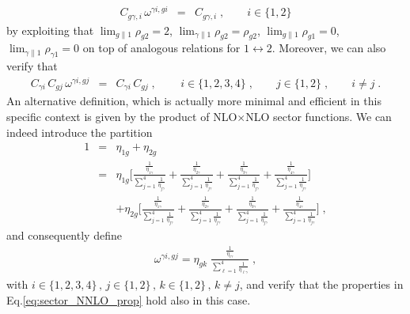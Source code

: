 \documentclass[12pt,a4paper]{article}
\newcommand{\nn}{\nonumber}
\newcommand{\beq}{\begin{eqnarray}}
\newcommand{\eeq}{\end{eqnarray}}
\begin{document}
\beq
C_{g\gamma,i} \, \omega^{\gamma i,gi} & = & C_{g\gamma,i} \; , \qquad i \in \{1,2\} 
\eeq
by exploiting that $\lim_{g \parallel 1} \rho_{g2} = 2$, 
$\lim_{\gamma \parallel 1} \rho_{g2}= \rho_{g2}$, 
$\lim_{g \parallel 1} \rho_{g1} = 0$, 
$\lim_{\gamma \parallel 1} \rho_{\gamma1} = 0$ on top of analogous relations for $1 \leftrightarrow 2$. Moreover, we can also verify that
\beq
C_{\gamma i} \, C_{g j} \, \omega^{\gamma i,g j} &=& C_{\gamma i} \, C_{gj} \; , \qquad  \, 
i\in \{1,2, 3, 4\} \; ,
\qquad 
 j\in \{1,2\}  \; , \qquad i\neq j \; .
 \label{eq:sector_NNLO_prop}
\eeq
An alternative definition, which is actually more minimal and efficient in this specific context is given by the product of NLO$\times$NLO sector functions. We can indeed introduce the partition
\beq
1 &=& \eta_{1g} + \eta_{2g}
\nn \\
&=&
\eta_{1g} \bigg[
\frac{ \frac{1}{\eta_{1\gamma}}}{\sum_{j=1}^4\frac{1}{\eta_{j\gamma}}}
+\frac{\frac{1}{\eta_{2\gamma}}}{\sum_{j=1}^4\frac{1}{\eta_{j\gamma}}}
+ \frac{\frac{1}{\eta_{3\gamma}}}{\sum_{j=1}^4\frac{1}{\eta_{j\gamma}}}
+\frac{\frac{1}{\eta_{4\gamma}}}{\sum_{j=1}^4\frac{1}{\eta_{j\gamma}}}
\bigg]
\nn \\
&& + \eta_{2g} \bigg[
\frac{ \frac{1}{\eta_{1\gamma}}}{\sum_{j=1}^4\frac{1}{\eta_{j\gamma}}}
+\frac{\frac{1}{\eta_{2\gamma}}}{\sum_{j=1}^4\frac{1}{\eta_{j\gamma}}}
+ \frac{\frac{1}{\eta_{3\gamma}}}{\sum_{j=1}^4\frac{1}{\eta_{j\gamma}}}
+\frac{\frac{1}{\eta_{4\gamma}}}{\sum_{j=1}^4\frac{1}{\eta_{j\gamma}}}
\bigg] \; ,
\label{eq:sector_minimal}
\eeq
and consequently define
\beq
 \omega^{\gamma i,gj} = \eta_{gk } \; 
 \frac{ \frac{1}{\eta_{i\gamma}}}{\sum_{\ell=1}^4\frac{1}{\eta_{\ell \gamma}}} \; ,
 \label{eq:NNLO_sector}
 \eeq
 with $ i\in \{1,2, 3, 4\}  \, , \,  j \in \{1,2\} \, , \, k  \in \{1,2\} \, , \, k \neq j$, 
and verify that the properties in Eq.\eqref{eq:sector_NNLO_prop} hold also in this case. \\
{} \\
\end{document}
